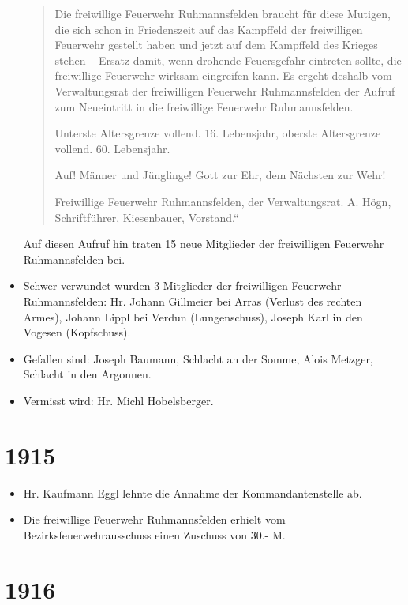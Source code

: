 \documentclass[12pt,a4paper]{book}
\begin{document}
\begin{itemize}
\begin{quote}
Die freiwillige Feuerwehr Ruhmannsfelden braucht für diese Mutigen, die
sich schon in Friedenszeit auf das Kampffeld der freiwilligen Feuerwehr
gestellt haben und jetzt auf dem Kampffeld des Krieges stehen – Ersatz
damit, wenn drohende Feuersgefahr eintreten sollte, die freiwillige
Feuerwehr wirksam eingreifen kann. Es ergeht deshalb vom Verwaltungsrat
der freiwilligen Feuerwehr Ruhmannsfelden der Aufruf zum Neueintritt in
die freiwillige Feuerwehr Ruhmannsfelden.

Unterste Altersgrenze vollend. 16. Lebensjahr, oberste Altersgrenze
vollend. 60. Lebensjahr.

Auf! Männer und Jünglinge! Gott zur Ehr, dem Nächsten zur Wehr!

Freiwillige Feuerwehr Ruhmannsfelden, der Verwaltungsrat. A. Högn,
Schriftführer, Kiesenbauer, Vorstand.“
\end{quote}

Auf diesen Aufruf hin traten 15 neue Mitglieder der freiwilligen
Feuerwehr Ruhmannsfelden bei.

\item Schwer verwundet wurden 3 Mitglieder der freiwilligen Feuerwehr
Ruhmannsfelden: Hr. Johann Gillmeier bei Arras (Verlust des rechten
Armes), Johann Lippl bei Verdun (Lungenschuss), Joseph Karl in den
Vogesen (Kopfschuss).

\item Gefallen sind: Joseph Baumann, Schlacht an der Somme, Alois
Metzger, Schlacht in den Argonnen.

\item Vermisst wird: Hr. Michl Hobelsberger.
\end{itemize}

\section*{1915}

\begin{itemize}
\item Hr. Kaufmann Eggl lehnte die Annahme der Kommandantenstelle ab.

\item Die freiwillige Feuerwehr Ruhmannsfelden erhielt vom
Bezirksfeuerwehrausschuss einen Zuschuss von 30.- M.
\end{itemize}

\section*{1916}
\end{document}
